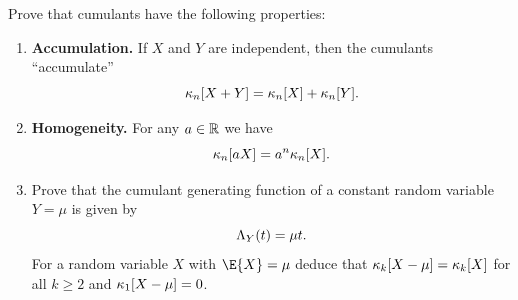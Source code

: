 \documentclass[11pt]{article}
\begin{document}
\begin{exercise}[subtitle={Properties of cumulants}]
    \label{ex: properties cumulants}
    Prove that cumulants have the following properties: 
    \begin{enumerate}[label=(\alph*), noitemsep]
        \item\label{it: (cumulants) accumulate} \textbf{Accumulation.}
        If \(X\) and \(Y\) are independent, then
        the cumulants ``accumulate''
        \[
            \kappa_n[X+Y] = \kappa_n[X] + \kappa_n[Y].
        \]

        \item\label{it: (cumulants) homogeneity}\textbf{Homogeneity.} For any \(a \in \mathbb{R}\) we have
        \[
            \kappa_n[aX] = a^n \kappa_n[X].
        \]

        \item\label{it: (cumulants) constant} Prove that the cumulant generating function of a constant random variable \(Y=\mu\)
        is given by
        \[
            \Lambda_Y(t) = \mu t.
        \]
        For a random variable \(X\) with \(\E{X} = \mu\) deduce that
        \(\kappa_k[X-\mu] = \kappa_k[X]\) for all \(k \ge 2\) and
        \(\kappa_1[X-\mu]=0\).
    \end{enumerate}
\end{exercise}
\end{document}

